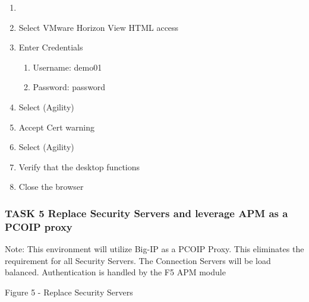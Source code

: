 \documentclass[letterpaper,10pt,english]{sphinxmanual}
\begin{document}
\begin{enumerate}
\item {} 

\item {} 
Select VMware Horizon View HTML access

\item {} 
Enter Credentials
\begin{enumerate}
\item {} 
Username: demo01

\item {} 
Password: password

\end{enumerate}

\item {} 
Select (Agility)

\item {} 
Accept Cert warning

\item {} 
Select (Agility)

\item {} 
Verify that the desktop functions

\item {} 
Close the browser

\end{enumerate}


\subsubsection{TASK 5 \textendash{} Replace Security Servers and leverage APM as a PCOIP proxy}
\label{\detokenize{class2/module1/lab1:task-5-replace-security-servers-and-leverage-apm-as-a-pcoip-proxy}}

Note: This environment will utilize Big-IP as a PCOIP Proxy. This
eliminates the requirement for all Security Servers. The Connection
Servers will be load balanced. Authentication is handled by the F5 APM
module


Figure 5 - Replace Security Servers
\end{document}
